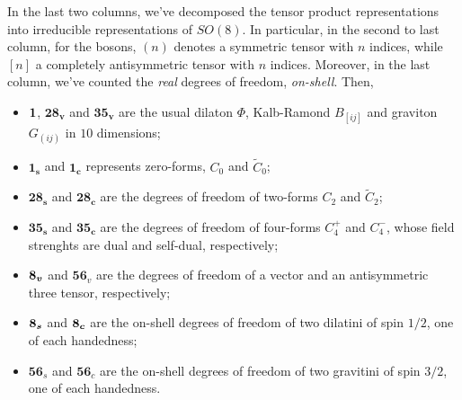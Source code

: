 In the last two columns, we've decomposed the tensor product representations into irreducible representations of $SO(8)$. In particular, in the second to last column, for the bosons, $(n)$ denotes a symmetric tensor with $n$ indices, while $[n]$ a completely antisymmetric tensor with $n$ indices. Moreover, in the last column, we've counted the \emph{real} degrees of freedom, \emph{on-shell}. Then,
\begin{itemize}
    \item $\boldsymbol{1}$, $\boldsymbol{28_v}$ and $\boldsymbol{35_v}$ are the usual dilaton $\Phi$, Kalb-Ramond $B_{[ij]}$ and graviton $G_{(ij)}$ in $10$ dimensions;
    \item $\boldsymbol{1_s}$ and $\boldsymbol{1_c}$ represents zero-forms, $C_0$ and $\tilde{C}_0$;
    \item $\boldsymbol{28_s}$ and $\boldsymbol{28_c}$ are the degrees of freedom of two-forms $C_2$ and $\tilde{C}_2$;
    \item $\boldsymbol{35_s}$ and $\boldsymbol{35_c}$ are the degrees of freedom of four-forms $C_4^+$ and $C_4^-$, whose field strenghts are dual and self-dual, respectively;
    \item $\boldsymbol{8_v}$ and $\boldsymbol{56}_v$ are the degrees of freedom of a vector and an antisymmetric three tensor, respectively;
    \item $\boldsymbol{8_s}$ and $\boldsymbol{8_c}$ are the on-shell degrees of freedom of two dilatini of spin $1/2$, one of each handedness;
    \item $\boldsymbol{56}_s$ and $\boldsymbol{56}_c$ are the on-shell degrees of freedom of two gravitini of spin $3/2$, one of each handedness.
\end{itemize}

